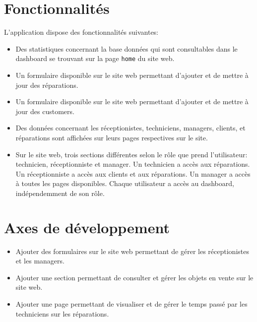 \documentclass{article}
\begin{document}
\section{Fonctionnalités}
L'application dispose des fonctionnalités suivantes:
\begin{itemize}
\item Des statistiques concernant la base données qui sont consultables dans le dashboard se trouvant sur la page \texttt{home} du site web.
\item Un formulaire disponible sur le site web permettant d'ajouter et de mettre à jour des réparations.
\item Un formulaire disponible sur le site web permettant d'ajouter et de mettre à jour des customers.
\item Des données concernant les réceptionistes, techniciens, managers, clients, et réparations sont affichées sur leurs pages respectives sur le site.
\item Sur le site web, trois sections différentes selon le rôle que prend l'utilisateur: technicien, réceptionniste et manager. Un technicien a accès aux réparations. 
Un réceptionniste a accès aux clients et aux réparations. Un manager a accès à toutes les pages disponibles. Chaque utilisateur a accès au dashboard, indépendemment de son rôle.
\end{itemize}

\section{Axes de développement}
\begin{itemize}
\item Ajouter des formulaires sur le site web permettant de gérer les réceptionistes et les managers.
\item Ajouter une section permettant de consulter et gérer les objets en vente sur le site web.
\item Ajouter une page permettant de visualiser et de gérer le temps passé par les techniciens sur les réparations.
\end{itemize}
\end{document}
